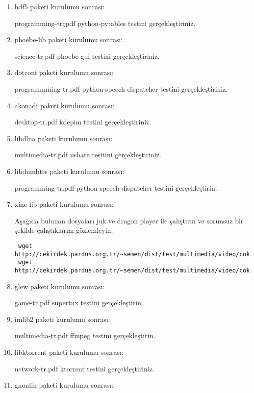 \documentclass[a4paper,10pt]{article}
\begin{document}
\begin{enumerate}
\item hdf5 paketi kurulumu sonrası:

programming-trçpdf python-pytables testini gerçekleştiriniz.

\item phoebe-lib paketi kurulumu sonrası:

science-tr.pdf phoebe-gui testini gerçekleştiriniz.

\item dotconf paketi kurulumu sonrası:

programmming-tr.pdf python-speech-dispatcher testini gerçekleştiriniz.

\item akonadi paketi kurulumu sonrası:

desktop-tr.pdf kdepim testini gerçekleştiriniz.

\item libdlna paketi kurulumu sonrası:

multimedia-tr.pdf ushare tesitini gerçekleştiriniz.

\item libdumbtts paketi kurulumu sonrası:

programming-tr.pdf python-speech-dispatcher testini gerçekleştirin.

\item xine-lib paketi kurulumu sonrası:

Aşağıda bulunan dosyaları juk ve dragon player ile çalıştırın ve sorunsuz bir şekilde çalıştıklarını gözlemleyin.

\begin{verbatim}
 wget http://cekirdek.pardus.org.tr/~semen/dist/test/multimedia/video/cokluortam/DVD.mpg
 wget http://cekirdek.pardus.org.tr/~semen/dist/test/multimedia/video/cokluortam/Lake_dance_XviD.AVI
\end{verbatim}


\item glew paketi kurulumu sonrası:

game-tr.pdf supertux testini gerçekleştirin.

\item imlib2 paketi kurulumu sonrası:

multimedia-tr.pdf ffmpeg testini gerçekleştirin.

\item libktorrent paketi kurulumu sonrası:

network-tr.pdf ktorrent testini gerçekleştiriniz.

\item gnonlin paketi kurulumu sonrası:


\end{enumerate}
\end{document}
